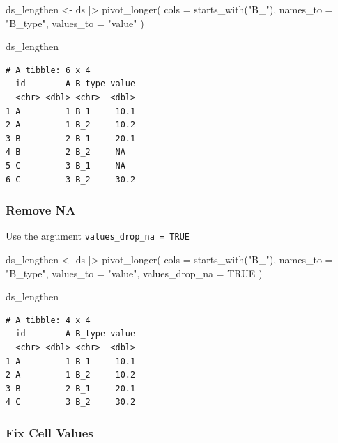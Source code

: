 \documentclass[
  letterpaper,
  DIV=11,
  numbers=noendperiod]{scrreprt}
\newenvironment{Shaded}{\begin{snugshade}}{\end{snugshade}}
\newcommand{\AttributeTok}[1]{\textcolor[rgb]{0.40,0.45,0.13}{#1}}
\newcommand{\ConstantTok}[1]{\textcolor[rgb]{0.56,0.35,0.01}{#1}}
\newcommand{\FunctionTok}[1]{\textcolor[rgb]{0.28,0.35,0.67}{#1}}
\newcommand{\NormalTok}[1]{\textcolor[rgb]{0.00,0.23,0.31}{#1}}
\newcommand{\OtherTok}[1]{\textcolor[rgb]{0.00,0.23,0.31}{#1}}
\newcommand{\SpecialCharTok}[1]{\textcolor[rgb]{0.37,0.37,0.37}{#1}}
\newcommand{\StringTok}[1]{\textcolor[rgb]{0.13,0.47,0.30}{#1}}
\begin{document}
\begin{Shaded}
\begin{Highlighting}[]
\NormalTok{ds\_lengthen }\OtherTok{\textless{}{-}}\NormalTok{ ds }\SpecialCharTok{|\textgreater{}} 
  \FunctionTok{pivot\_longer}\NormalTok{(}
    \AttributeTok{cols =} \FunctionTok{starts\_with}\NormalTok{(}\StringTok{"B\_"}\NormalTok{),}
    \AttributeTok{names\_to =} \StringTok{"B\_type"}\NormalTok{,}
    \AttributeTok{values\_to =} \StringTok{"value"}
\NormalTok{  )}

\NormalTok{ds\_lengthen}
\end{Highlighting}
\end{Shaded}

\begin{verbatim}
# A tibble: 6 x 4
  id        A B_type value
  <chr> <dbl> <chr>  <dbl>
1 A         1 B_1     10.1
2 A         1 B_2     10.2
3 B         2 B_1     20.1
4 B         2 B_2     NA  
5 C         3 B_1     NA  
6 C         3 B_2     30.2
\end{verbatim}

\subsubsection{Remove NA}\label{remove-na}

Use the argument \texttt{values\_drop\_na\ =\ TRUE}

\begin{Shaded}
\begin{Highlighting}[]
\NormalTok{ds\_lengthen }\OtherTok{\textless{}{-}}\NormalTok{ ds }\SpecialCharTok{|\textgreater{}} 
  \FunctionTok{pivot\_longer}\NormalTok{(}
    \AttributeTok{cols =} \FunctionTok{starts\_with}\NormalTok{(}\StringTok{"B\_"}\NormalTok{),}
    \AttributeTok{names\_to =} \StringTok{"B\_type"}\NormalTok{,}
    \AttributeTok{values\_to =} \StringTok{"value"}\NormalTok{,}
    \AttributeTok{values\_drop\_na =} \ConstantTok{TRUE}
\NormalTok{  )}

\NormalTok{ds\_lengthen}
\end{Highlighting}
\end{Shaded}

\begin{verbatim}
# A tibble: 4 x 4
  id        A B_type value
  <chr> <dbl> <chr>  <dbl>
1 A         1 B_1     10.1
2 A         1 B_2     10.2
3 B         2 B_1     20.1
4 C         3 B_2     30.2
\end{verbatim}

\subsubsection{Fix Cell Values}\label{fix-cell-values}
\end{document}
